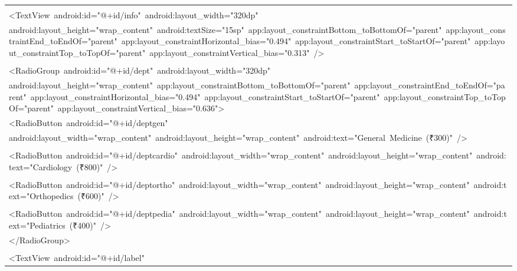 \documentclass[a4paper,12pt]{article}
\begin{document}
\begin{longtable}{|p{}|}
\strut \\
{\ttfamily\small \textless{}TextView\ android:id="@+id/info"\ android:layout\_width="320dp"} \\
{\ttfamily\small android:layout\_height="wrap\_content"\ android:textSize="15sp"\ app:layout\_constraintBottom\_toBottomOf="parent"\ app:layout\_constraintEnd\_toEndOf="parent"\ app:layout\_constraintHorizontal\_bias="0.494"\ app:layout\_constraintStart\_toStartOf="parent"\ app:layout\_constraintTop\_toTopOf="parent"\ app:layout\_constraintVertical\_bias="0.313"\ /\textgreater{}} \\
\strut \\
{\ttfamily\small \textless{}RadioGroup\ android:id="@+id/dept"\ android:layout\_width="320dp"} \\
{\ttfamily\small android:layout\_height="wrap\_content"\ app:layout\_constraintBottom\_toBottomOf="parent"\ app:layout\_constraintEnd\_toEndOf="parent"\ app:layout\_constraintHorizontal\_bias="0.494"\ app:layout\_constraintStart\_toStartOf="parent"\ app:layout\_constraintTop\_toTopOf="parent"\ app:layout\_constraintVertical\_bias="0.636"\textgreater{}} \\
{\ttfamily\small \textless{}RadioButton\ android:id="@+id/deptgen"} \\
{\ttfamily\small android:layout\_width="wrap\_content"\ android:layout\_height="wrap\_content"\ android:text="General\ Medicine\ (₹300)"\ /\textgreater{}} \\
\strut \\
{\ttfamily\small \textless{}RadioButton\ android:id="@+id/deptcardio"\ android:layout\_width="wrap\_content"\ android:layout\_height="wrap\_content"\ android:text="Cardiology\ (₹800)"\ /\textgreater{}} \\
\strut \\
{\ttfamily\small \textless{}RadioButton\ android:id="@+id/deptortho"\ android:layout\_width="wrap\_content"\ android:layout\_height="wrap\_content"\ android:text="Orthopedics\ (₹600)"\ /\textgreater{}} \\
\strut \\
{\ttfamily\small \textless{}RadioButton\ android:id="@+id/deptpedia"\ android:layout\_width="wrap\_content"\ android:layout\_height="wrap\_content"\ android:text="Pediatrics\ (₹400)"\ /\textgreater{}} \\
{\ttfamily\small \textless{}/RadioGroup\textgreater{}} \\
\strut \\
{\ttfamily\small \textless{}TextView\ android:id="@+id/label"} \\

\end{longtable}
\end{document}
